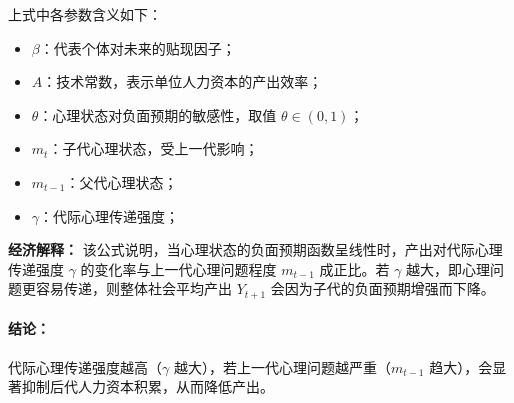 \documentclass[12pt]{article}
\begin{document}
上式中各参数含义如下：
\begin{itemize}
  \item $\beta$：代表个体对未来的贴现因子；
  \item $A$：技术常数，表示单位人力资本的产出效率；
  \item $\theta$：心理状态对负面预期的敏感性，取值 $\theta \in (0,1)$；
  \item $m_t$：子代心理状态，受上一代影响；
  \item $m_{t-1}$：父代心理状态；
  \item $\gamma$：代际心理传递强度；
\end{itemize}

\textbf{经济解释：} 该公式说明，当心理状态的负面预期函数呈线性时，产出对代际心理传递强度 $\gamma$ 的变化率与上一代心理问题程度 $m_{t-1}$ 成正比。若 $\gamma$ 越大，即心理问题更容易传递，则整体社会平均产出 $Y_{t+1}$ 会因为子代的负面预期增强而下降。

\paragraph{结论：}
代际心理传递强度越高（$\gamma$ 越大），若上一代心理问题越严重（$m_{t-1}$ 趋大），会显著抑制后代人力资本积累，从而降低产出。
\end{document}
